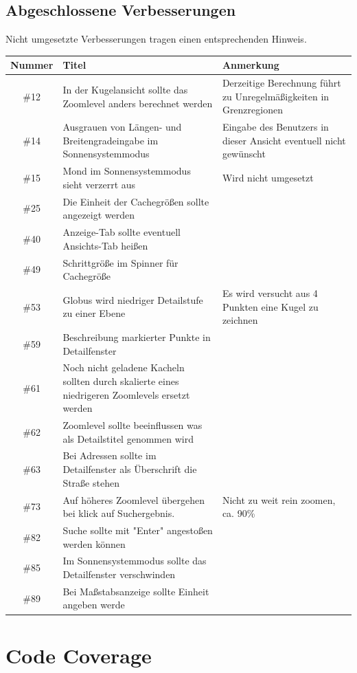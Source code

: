 \documentclass[10pt]{scrreprt}
\begin{document}
\section{Abgeschlossene Verbesserungen}
Nicht umgesetzte Verbesserungen tragen einen entsprechenden Hinweis.
\begin{longtable}{|c|p{5.2cm}|p{8.2cm}|}
\hline
Nummer & Titel & Anmerkung \\
\hline
\hline
\#12 & In der Kugelansicht sollte das Zoomlevel anders berechnet werden & Derzeitige Berechnung führt zu Unregelmäßigkeiten in Grenzregionen \\
\hline
\#14 & Ausgrauen von Längen- und Breitengradeingabe im Sonnensystemmodus & Eingabe des Benutzers in dieser Ansicht eventuell nicht gewünscht \\
\hline
\#15 & Mond im Sonnensystemmodus sieht verzerrt aus & Wird nicht umgesetzt \\
\hline
\#25 & Die Einheit der Cachegrößen sollte angezeigt werden & \\ 
\hline
\#40 & Anzeige-Tab sollte eventuell Ansichts-Tab heißen & \\
\hline
\#49 & Schrittgröße im Spinner für Cachegröße & \\
\hline
\#53 & Globus wird niedriger Detailstufe zu einer Ebene & Es wird versucht aus 4 Punkten eine Kugel zu zeichnen \\
\hline
\#59 & Beschreibung markierter Punkte in Detailfenster & \\
\hline
\#61 & Noch nicht geladene Kacheln sollten durch skalierte eines niedrigeren Zoomlevels ersetzt werden & \\
\hline
\#62 & Zoomlevel sollte beeinflussen was als Detailstitel genommen wird & \\
\hline
\#63 & Bei Adressen sollte im Detailfenster als Überschrift die Straße stehen & \\
\hline
\#73 & Auf höheres Zoomlevel übergehen bei klick auf Suchergebnis. & Nicht zu weit rein zoomen, ca. 90\% \\
\hline
\#82 & Suche sollte mit "Enter" angestoßen werden können & \\
\hline
\#85 & Im Sonnensystemmodus sollte das Detailfenster verschwinden & \\
\hline
\#89 & Bei Maßstabsanzeige sollte Einheit angeben werde & \\
\hline
\end{longtable}

\chapter{Code Coverage}
\end{document}
